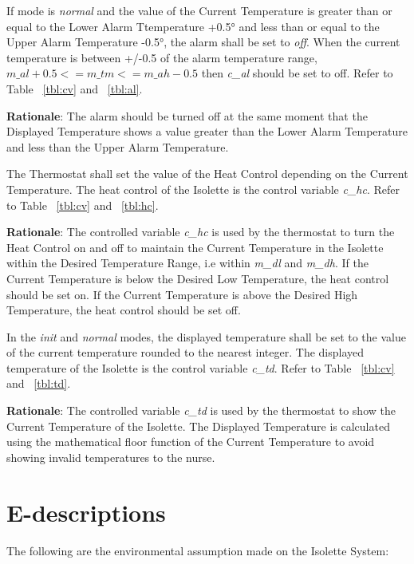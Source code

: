 \documentclass[fontsize=12pt,paper=letter,twoside]{scrartcl}
\begin{document}
\rdescription
{If mode is \emph{normal} and the value of the Current Temperature is greater than or equal to the Lower Alarm Ttemperature +0.5° and less than or equal to the Upper Alarm Temperature -0.5°, the alarm shall be set to \emph{off}.}
{When the current temperature is between +/-0.5 of the alarm temperature range, $m\_al+0.5 <= m\_tm <= m\_ah - 0.5$ then \emph{c\_al} should be set to off. Refer to Table ~\ref{tbl:cv} and ~\ref{tbl:al}.}
\label{R5}

\smallskip
\noindent \textbf{Rationale}: The alarm should be turned off at the same moment that the Displayed Temperature shows a value greater than the Lower Alarm Temperature and less than the Upper Alarm Temperature.

\rdescription
{The Thermostat shall set the value of the Heat Control depending on the Current Temperature.}
{The heat control of the Isolette is the control variable \emph{c\_hc}. Refer to Table ~\ref{tbl:cv} and ~\ref{tbl:hc}.}
\label{R6}

\smallskip
\noindent \textbf{Rationale}: The controlled variable \emph{c\_hc} is used by the thermostat to turn the Heat Control on and off to maintain the Current Temperature in the Isolette within the Desired Temperature Range, i.e within \emph{m\_dl} and \emph{m\_dh}. If the Current Temperature is below the Desired Low Temperature, the heat control should be set on. If the Current Temperature is above the Desired High Temperature, the heat control should be set off.

\rdescription
{In the \emph{init} and \emph{normal} modes, the displayed temperature shall be set to the value of the current temperature rounded to the nearest integer.}
{The displayed temperature of the Isolette is the control variable \emph{c\_td}. Refer to Table ~\ref{tbl:cv} and ~\ref{tbl:td}.} %
\label{R7}

\smallskip
\noindent \textbf{Rationale}: The controlled variable \emph{c\_td} is used by the thermostat to show the Current Temperature of the Isolette. The Displayed Temperature is calculated using the mathematical floor function of the Current Temperature to avoid showing invalid temperatures to the nurse.

\newpage
\section{E-descriptions}

The following are the environmental assumption made on the Isolette System:
\end{document}
